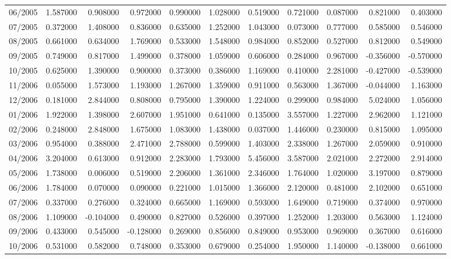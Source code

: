 \begin{tabular}{lrrrrrrrrrr}
06/2005 & 1.587000 & 0.908000 & 0.972000 & 0.990000 & 1.028000 & 0.519000 & 0.721000 & 0.087000 & 0.821000 & 0.403000 \\
07/2005 & 0.372000 & 1.408000 & 0.836000 & 0.635000 & 1.252000 & 1.043000 & 0.073000 & 0.777000 & 0.585000 & 0.546000 \\
08/2005 & 0.661000 & 0.634000 & 1.769000 & 0.533000 & 1.548000 & 0.984000 & 0.852000 & 0.527000 & 0.812000 & 0.549000 \\
09/2005 & 0.749000 & 0.817000 & 1.499000 & 0.378000 & 1.059000 & 0.606000 & 0.284000 & 0.967000 & -0.356000 & -0.570000 \\
10/2005 & 0.625000 & 1.390000 & 0.900000 & 0.373000 & 0.386000 & 1.169000 & 0.410000 & 2.281000 & -0.427000 & -0.539000 \\
11/2006 & 0.055000 & 1.573000 & 1.193000 & 1.267000 & 1.359000 & 0.911000 & 0.563000 & 1.367000 & -0.044000 & 1.163000 \\
12/2006 & 0.181000 & 2.844000 & 0.808000 & 0.795000 & 1.390000 & 1.224000 & 0.299000 & 0.984000 & 5.024000 & 1.056000 \\
01/2006 & 1.922000 & 1.398000 & 2.607000 & 1.951000 & 0.641000 & 0.135000 & 3.557000 & 1.227000 & 2.962000 & 1.121000 \\
02/2006 & 0.248000 & 2.848000 & 1.675000 & 1.083000 & 1.438000 & 0.037000 & 1.446000 & 0.230000 & 0.815000 & 1.095000 \\
03/2006 & 0.954000 & 0.388000 & 2.471000 & 2.788000 & 0.599000 & 1.403000 & 2.338000 & 1.267000 & 2.059000 & 0.910000 \\
04/2006 & 3.204000 & 0.613000 & 0.912000 & 2.283000 & 1.793000 & 5.456000 & 3.587000 & 2.021000 & 2.272000 & 2.914000 \\
05/2006 & 1.738000 & 0.006000 & 0.519000 & 2.206000 & 1.361000 & 2.346000 & 1.764000 & 1.020000 & 3.197000 & 0.879000 \\
06/2006 & 1.784000 & 0.070000 & 0.090000 & 0.221000 & 1.015000 & 1.366000 & 2.120000 & 0.481000 & 2.102000 & 0.651000 \\
07/2006 & 0.337000 & 0.276000 & 0.324000 & 0.665000 & 1.169000 & 0.593000 & 1.649000 & 0.719000 & 0.374000 & 0.970000 \\
08/2006 & 1.109000 & -0.104000 & 0.490000 & 0.827000 & 0.526000 & 0.397000 & 1.252000 & 1.203000 & 0.563000 & 1.124000 \\
09/2006 & 0.433000 & 0.545000 & -0.128000 & 0.269000 & 0.856000 & 0.849000 & 0.953000 & 0.969000 & 0.367000 & 0.616000 \\
10/2006 & 0.531000 & 0.582000 & 0.748000 & 0.353000 & 0.679000 & 0.254000 & 1.950000 & 1.140000 & -0.138000 & 0.661000 \\

\end{tabular}
